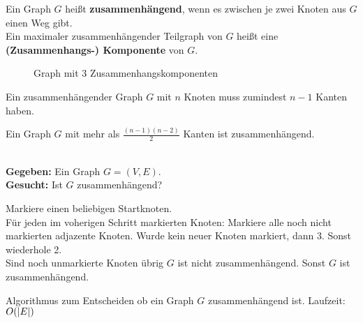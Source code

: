 	\begin{definition}[Zusammenhängend]
		Ein Graph $G$ heißt \textbf{zusammenhängend}, wenn es zwischen je zwei Knoten aus $G$ einen Weg gibt.\\[5pt]
		Ein maximaler zusammenhängender Teilgraph von $G$ heißt eine \textbf{(Zusammenhangs-) Komponente} von $G$.
	\end{definition}
	\begin{figure}[ht]
	\begin{center}
		\caption{Graph mit 3 Zusammenhangskomponenten}
	\end{center}
	\vspace*{-15pt}
	\end{figure}
	\begin{satz}
		Ein zusammenhängender Graph $G$ mit $n$ Knoten muss zumindest $n - 1$ Kanten haben.
	\end{satz}
	\begin{satz}
		Ein Graph $G$ mit mehr als $\frac{(n-1)(n-2)}{2}$ Kanten ist zusammenhängend.
	\end{satz}
	\begin{problem}[Zusammenhang]~\\[5pt]
		\hspace*{10pt}\textbf{Gegeben: } Ein Graph $G = (V, E)$.\\[5pt]
		\hspace*{10pt}\textbf{Gesucht: } Ist $G$ zusammenhängend?
	\end{problem}
	\begin{algorithm}[H]
		\vspace*{5pt}
		Markiere einen beliebigen Startknoten.\\
		Für jeden im voherigen Schritt markierten Knoten: Markiere alle noch nicht markierten adjazente Knoten. Wurde kein neuer Knoten markiert, dann 3. Sonst wiederhole 2.\\
		Sind noch unmarkierte Knoten übrig \Return \dq $G$ ist nicht zusammenhängend\dq. Sonst \dq$G$ ist zusammenhängend\dq.
		\caption{Algorithmus zum Entscheiden ob ein Graph $G$ zusammenhängend ist. Laufzeit: $O(\vert E \vert)$}
	\end{algorithm}
